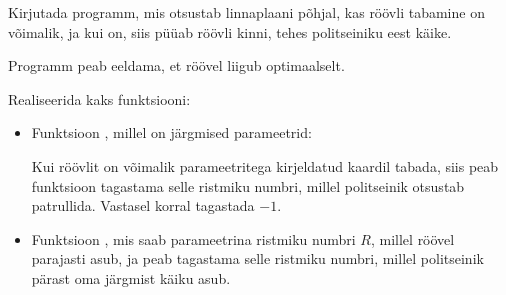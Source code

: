 \documentclass{boi2014-et}
\begin{document}
    \Task

    Kirjutada programm, mis otsustab linnaplaani põhjal,
    kas röövli tabamine on võimalik, ja kui on,
    siis püüab röövli kinni, tehes politseiniku eest käike.

    Programm peab eeldama, et röövel liigub optimaalselt.

    \Implementation

    Realiseerida kaks funktsiooni:
    \begin{itemize}
        \item Funktsioon , millel on järgmised parameetrid:

            Kui röövlit on võimalik parameetritega kirjeldatud kaardil tabada,
            siis peab funktsioon  tagastama selle ristmiku numbri,
            millel politseinik otsustab patrullida.
            Vastasel korral tagastada $-1$.

        \item Funktsioon ,
            mis saab parameetrina ristmiku numbri $R$,
            millel röövel parajasti asub,
            ja peab tagastama selle ristmiku numbri,
            millel politseinik pärast oma järgmist käiku asub.
    \end{itemize}
\end{document}
